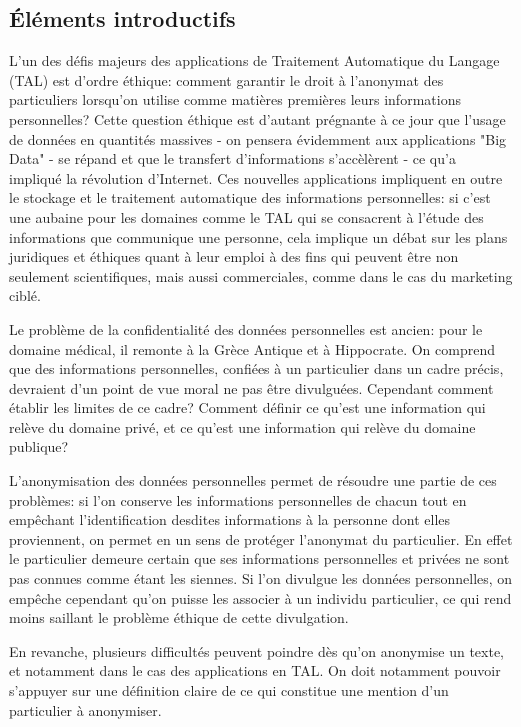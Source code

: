 \documentclass{article}
\begin{document}
\subsection{Éléments introductifs}
\par
L'un des défis majeurs des applications de Traitement Automatique du Langage (TAL) est d'ordre éthique: comment garantir le droit à l'anonymat des particuliers lorsqu'on utilise comme matières premières leurs informations personnelles?
Cette question éthique est d'autant prégnante à ce jour que l'usage de données en quantités massives - on pensera évidemment aux applications "Big Data" - se répand et que le transfert d'informations s'accèlèrent - ce qu'a impliqué la révolution d'Internet.
Ces nouvelles applications impliquent en outre le stockage et le traitement automatique des informations personnelles: si c'est une aubaine pour les domaines comme le TAL qui se consacrent à l'étude des informations que communique une personne, cela implique un débat sur les plans juridiques et éthiques quant à leur emploi à des fins qui peuvent être non seulement scientifiques, mais aussi commerciales, comme dans le cas du marketing ciblé.
\par
Le problème de la confidentialité des données personnelles est ancien: pour le domaine médical, il remonte à la Grèce Antique et à Hippocrate.
On comprend que des informations personnelles, confiées à un particulier dans un cadre précis, devraient d'un point de vue moral ne pas être divulguées.
Cependant comment établir les limites de ce cadre?
Comment définir ce qu'est une information qui relève du domaine privé, et ce qu'est une information qui relève du domaine publique?
\par
L'anonymisation des données personnelles permet de résoudre une partie de ces problèmes: si l'on conserve les informations personnelles de chacun tout en empêchant l'identification desdites informations à la personne dont elles proviennent, on permet en un sens de protéger l'anonymat du particulier.
En effet le particulier demeure certain que ses informations personnelles et privées ne sont pas connues comme étant les siennes.
Si l'on divulgue les données personnelles, on empêche cependant qu'on puisse les associer à un individu particulier, ce qui rend moins saillant le problème éthique de cette divulgation.
\par
En revanche, plusieurs difficultés peuvent poindre dès qu'on anonymise un texte, et notamment dans le cas des applications en TAL.
On doit notamment pouvoir s'appuyer sur une définition claire de ce qui constitue une mention d'un particulier à anonymiser.
\end{document}
